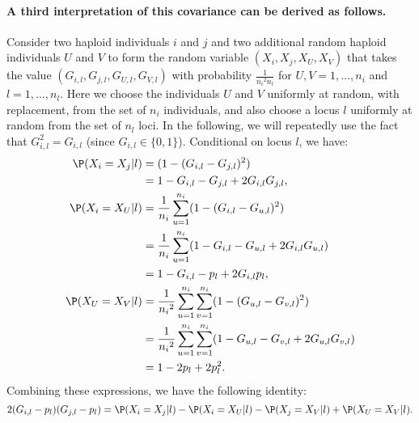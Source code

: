 \paragraph{A third interpretation of this covariance can be derived as follows.}
%
Consider two haploid individuals $i$ and $j$ and
two additional random haploid individuals $U$ and $V$ to
form the random variable $(X_i, X_j, X_U, X_V)$
that takes the value $(G_{i,l}, G_{j,l}, G_{U,l}, G_{V,l})$
with probability $\frac{1}{{n_i}^2 n_l}$
for $U, V = 1, \dots, n_i$ and $l = 1, \dots, n_l$.
%
Here we choose the individuals $U$ and $V$ uniformly at
random, with replacement, from the set of $n_i$ individuals, and
also choose a locus $l$ uniformly at random from the set of $n_l$ loci.
%
In the following, we will repeatedly use the fact that
$G^2_{i,l} = G_{i,l}$ (since $G_{i,l} \in \{0, 1\}$).
%
Conditional on locus $l$, we have:
%
\begin{align*}
    \P(X_i = X_j | l) &= (1 - (G_{i,l} - G_{j,l})^2) \\
                      &= 1 - G_{i,l} - G_{j,l} + 2G_{i,l}G_{j,l}, \\
    \P(X_i = X_U | l) &= \frac{1}{n_i}\sum_{u=1}^{n_i} (1 - (G_{i,l} - G_{u,l})^2) \\
                      &= \frac{1}{n_i}\sum_{u=1}^{n_i} (1 - G_{i,l} - G_{u,l} + 2G_{i,l}G_{u,l}) \\
                      &= 1 - G_{i,l} - p_l + 2G_{i,l}p_l, \\
    \P(X_U = X_V | l) &= \frac{1}{{n_i}^2}\sum_{u=1}^{n_i}\sum_{v=1}^{n_i} (1 - (G_{u,l} - G_{v,l})^2) \\
                      &= \frac{1}{{n_i}^2}\sum_{u=1}^{n_i}\sum_{v=1}^{n_i} (1 - G_{u,l} - G_{v,l} + 2G_{u,l}G_{v,l}) \\
                      &= 1 - 2p_l + 2p^2_l.
\end{align*}
%
Combining these expressions, we have the following identity:
%
\[ 2(G_{i,l} - p_l)(G_{j,l} - p_l) = \P(X_i = X_j | l) - \P(X_i = X_U | l) - \P(X_j = X_V | l) + \P(X_U = X_V | l) .\]
